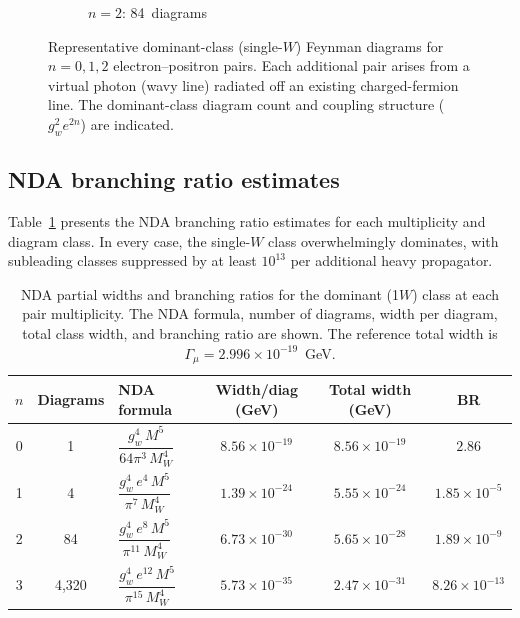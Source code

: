 \documentclass[11pt,a4paper]{article}
\begin{document}
\begin{figure}[h]
\begin{subfigure}[b]{0.35\textwidth}
\caption*{$n=2$: 84~diagrams}
\end{subfigure}
\caption{Representative dominant-class (single-$W$) Feynman diagrams for
$n = 0, 1, 2$ electron--positron pairs.
Each additional pair arises from a virtual photon (wavy line) radiated
off an existing charged-fermion line.
The dominant-class diagram count and coupling structure
($g_w^2 e^{2n}$) are indicated.}
\label{fig:diagrams}
\end{figure}


\subsection{NDA branching ratio estimates}
\label{sec:nda}

Table~\ref{tab:nda} presents the NDA branching ratio estimates for
each multiplicity and diagram class.
In every case, the single-$W$ class overwhelmingly dominates, with
subleading classes suppressed by at least $10^{13}$ per additional
heavy propagator.

\begin{table}[h]
\centering
\caption{NDA partial widths and branching ratios for the dominant
(1$W$) class at each pair multiplicity.
The NDA formula, number of diagrams, width per diagram, total class
width, and branching ratio are shown.
The reference total width is
$\Gamma_\mu = 2.996\times10^{-19}$~GeV.}
\label{tab:nda}
\begin{tabular}{cclccc}
\toprule
$n$ & Diagrams & NDA formula & Width/diag (GeV) & Total width (GeV) & BR \\
\midrule
0 & 1
  & $\dfrac{g_w^4\, M^5}{64\pi^3\, M_W^4}$
  & $8.56\times10^{-19}$ & $8.56\times10^{-19}$ & $2.86$ \\[8pt]
1 & 4
  & $\dfrac{g_w^4\, e^4\, M^5}{\pi^7\, M_W^4}$
  & $1.39\times10^{-24}$ & $5.55\times10^{-24}$ & $1.85\times10^{-5}$ \\[8pt]
2 & 84
  & $\dfrac{g_w^4\, e^8\, M^5}{\pi^{11}\, M_W^4}$
  & $6.73\times10^{-30}$ & $5.65\times10^{-28}$ & $1.89\times10^{-9}$ \\[8pt]
3 & 4{,}320
  & $\dfrac{g_w^4\, e^{12}\, M^5}{\pi^{15}\, M_W^4}$
  & $5.73\times10^{-35}$ & $2.47\times10^{-31}$ & $8.26\times10^{-13}$ \\
\bottomrule
\end{tabular}
\end{table}
\end{document}

